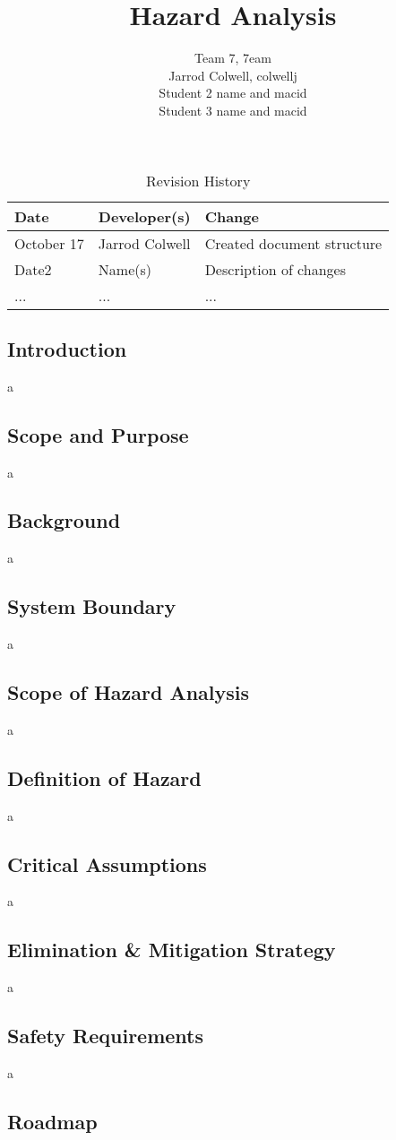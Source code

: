 \documentclass{article}
\title{Hazard Analysis\\\progname}
\author{Team 7, 7eam
		\\ Jarrod Colwell, colwellj
		\\ Student 2 name and macid
		\\ Student 3 name and macid
}
\date{}
\begin{document}
	\begin{table}[hp]
	\caption{Revision History} \label{TblRevisionHistory}
	\begin{tabularx}{\textwidth}{llX}
	\toprule
	\textbf{Date} & \textbf{Developer(s)} & \textbf{Change}\\
	\midrule
	October 17 & Jarrod Colwell & Created document structure\\
	Date2 & Name(s) & Description of changes\\
	... & ... & ...\\
	\bottomrule
	\end{tabularx}
	\end{table}

	\newpage

	\maketitle

	\newpage

	\subsection{Introduction}
	a

	\subsection{Scope and Purpose}
	a

	\subsection{Background}
	a

	\subsection{System Boundary}
	a

	\subsection{Scope of Hazard Analysis}
	a

	\subsection{Definition of Hazard}
	a

	\subsection{Critical Assumptions}
	a

	\subsection{Elimination \& Mitigation Strategy}
	a

	\subsection{Safety Requirements}
	a

	\subsection{Roadmap}
\end{document}
